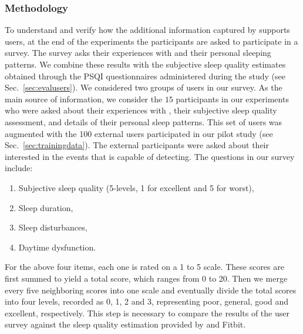 \subsubsection{Methodology}
To understand and verify how the additional information captured by {\systemname} supports users, at the end of the experiments the
participants are asked to participate in a survey. The survey asks their experiences with {\systemname} and their personal sleeping
patterns. We combine these results with the subjective sleep quality estimates obtained through the PSQI questionnaires administered during
the study (see Sec.~\ref{sec:evalusers}). We considered two groups of users in our survey. As the main source of information, we consider
the $15$ participants in our experiments who were asked about their experiences with {\systemname}, their subjective sleep quality
assessment, and details of their personal sleep patterns. This set of users was augmented with the 100 external users participated in our
pilot study (see Sec.~\ref{sec:trainingdata}). The external participants were asked about their interested in the events that {\systemname}
is capable of detecting. The questions in our survey include:
\begin{enumerate}
  \item Subjective sleep quality (5-levels, 1 for excellent and 5 for worst),
  \item Sleep duration,
  \item Sleep disturbances,
  \item Daytime dysfunction.
\end{enumerate}
For the above four items, each one is rated on a 1 to 5 scale. These scores are first summed to yield a total score, which ranges from 0 to 20. Then we merge every five neighboring scores into one scale and eventually divide the total scores into four levels, recorded as 0, 1, 2 and 3, representing poor, general, good and excellent, respectively. This step is necessary to compare the results of the user survey against the sleep quality estimation provided by {\systemname} and Fitbit.

